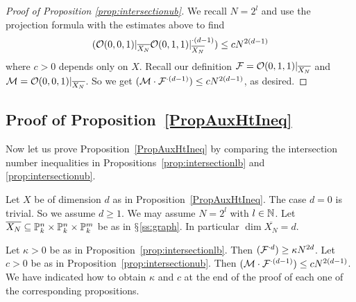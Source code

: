 \begin{proof}[Proof of Proposition \ref{prop:intersectionub}]
We recall $N=2^l$ and use the projection formula with the estimates
above to find 
\begin{equation*}
  ({\mathcal O}(0,0,1)|_{\overline{X_N}} 
  {\mathcal O}(0,1,1)|_{\overline{X_N}}^{\cdot(d-1)}) \le  c N^{2(d-1)}
\end{equation*}
where $c>0$ depends only on $X$. 
Recall our definition ${\mathcal F} = {\mathcal O}(0,1,1)|_{\overline{X_N}}$ and ${\mathcal M} =
{\mathcal O}(0,0,1)|_{\overline{X_N}}$. So we get 
$  ({\mathcal M}\cdot {\mathcal F}^{\cdot(d-1)}) \le c N^{2(d-1)}$, as desired. 
%
%
\end{proof}


\subsection{Proof of Proposition~\ref{PropAuxHtIneq}}\label{SubsectionProofOfAUxHtIneq}
Now let us prove Proposition~\ref{PropAuxHtIneq} by comparing the intersection number inequalities in
Propositions~\ref{prop:intersectionlb} and \ref{prop:intersectionub}.

Let $X$ be of dimension $d$ as in Proposition~\ref{PropAuxHtIneq}. The
case $d = 0$ is trivial. So we assume $d \ge 1$. We may assume $N=2^l$
with $l \in {\mathbb{N}}$. Let $\overline{X_N} \subseteq {\mathbb{P}}_k^n \times {\mathbb{P}}_k^n \times {\mathbb{P}}_k^m$ be as in $\mathsection$\ref{ss:graph}. In particular $\dim \overline{X_N} = d$.

Let $\kappa > 0$ be as in Proposition~\ref{prop:intersectionlb}. Then
$({\mathcal F}^{\cdot d}) \ge \kappa N^{2d}$. Let $c > 0$ be as in
Proposition~\ref{prop:intersectionub}. Then $({\mathcal M} \cdot {\mathcal F}^{\cdot
(d-1)}) \le c N^{2(d-1)}$.
We have indicated how to obtain  $\kappa$ and $c$  at the end of the proof of each one of the corresponding propositions.

